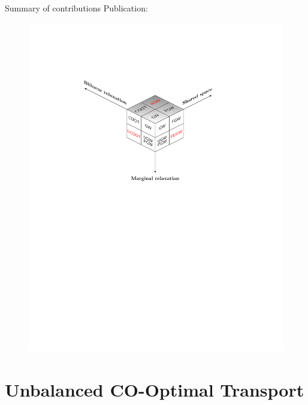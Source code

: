 \documentclass{beamer}
\begin{document}
\begin{frame}{Summary of contributions}
  \tiny
  Publication:
  \vspace{-2cm}
  \begin{figure}
    \centering
    \includegraphics[width=1.1\linewidth, keepaspectratio=true]{OT_new/cube_agw.pdf}
  \end{figure}
\end{frame}

\section{Unbalanced CO-Optimal Transport}
\end{document}
